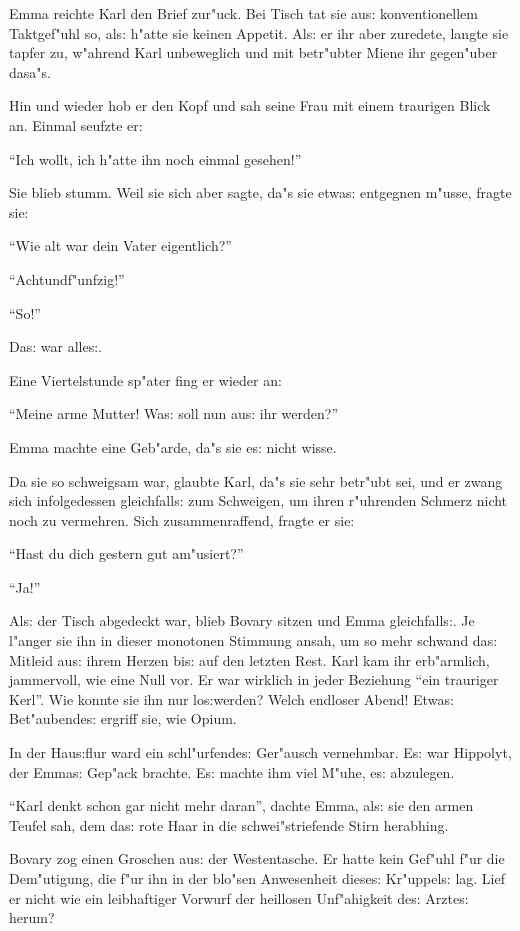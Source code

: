 \documentclass[oneside,12pt]{book}
\newcommand{\s}{s:}%
\begin{document}
Emma reichte Karl den Brief zur"uck. Bei Tisch tat sie au{\s}
konventionellem Taktgef"uhl so, al{\s} h"atte sie keinen Appetit.
Al{\s} er ihr aber zuredete, langte sie tapfer zu, w"ahrend Karl
unbeweglich und mit betr"ubter Miene ihr gegen"uber dasa"s.

Hin und wieder hob er den Kopf und sah seine Frau mit einem
traurigen Blick an. Einmal seufzte er:

"`Ich wollt, ich h"atte ihn noch einmal gesehen!"'

Sie blieb stumm. Weil sie sich aber sagte, da"s sie etwa{\s}
entgegnen m"usse, fragte sie:

"`Wie alt war dein Vater eigentlich?"'

"`Achtundf"unfzig!"'

"`So!"'

Da{\s} war alle{\s}.

Eine Viertelstunde sp"ater fing er wieder an:

"`Meine arme Mutter! Wa{\s} soll nun au{\s} ihr werden?"'

Emma machte eine Geb"arde, da"s sie e{\s} nicht wisse.

Da sie so schweigsam war, glaubte Karl, da"s sie sehr betr"ubt
sei, und er zwang sich infolgedessen gleichfall{\s} zum Schweigen,
um ihren r"uhrenden Schmerz nicht noch zu vermehren. Sich
zusammenraffend, fragte er sie:

"`Hast du dich gestern gut am"usiert?"'

"`Ja!"'

Al{\s} der Tisch abgedeckt war, blieb Bovary sitzen und Emma
gleichfall{\s}. Je l"anger sie ihn in dieser monotonen Stimmung
ansah, um so mehr schwand da{\s} Mitleid au{\s} ihrem Herzen
bi{\s} auf den letzten Rest. Karl kam ihr erb"armlich, jammervoll,
wie eine Null vor. Er war wirklich in jeder Beziehung "`ein
trauriger Kerl"'. Wie konnte sie ihn nur lo{\s}werden? Welch
endloser Abend! Etwa{\s} Bet"aubende{\s} ergriff sie, wie Opium.

In der Hau{\s}flur ward ein schl"urfende{\s} Ger"ausch vernehmbar.
E{\s} war Hippolyt, der Emma{\s} Gep"ack brachte. E{\s} machte ihm
viel M"uhe, e{\s} abzulegen.

"`Karl denkt schon gar nicht mehr daran"', dachte Emma, al{\s} sie
den armen Teufel sah, dem da{\s} rote Haar in die
schwei"striefende Stirn herabhing.

Bovary zog einen Groschen au{\s} der Westentasche. Er hatte kein
Gef"uhl f"ur die Dem"utigung, die f"ur ihn in der blo"sen
Anwesenheit diese{\s} Kr"uppel{\s} lag. Lief er nicht wie ein
leibhaftiger Vorwurf der heillosen Unf"ahigkeit de{\s} Arzte{\s}
herum?
\end{document}

